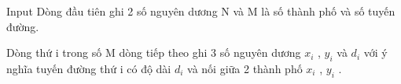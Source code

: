Input  
Dòng đầu tiên ghi 2 số nguyên dương N và M là số thành phố và số tuyến đường.  

   Dòng thứ i trong số M dòng tiếp theo ghi 3 số nguyên dương $x_{i}$   , $y_{i}$   và $d_{i}$   với ý nghĩa tuyến đường thứ i có độ dài $d_{i}$   và nối giữa 2 thành phố $x_{i}$   , $y_{i}$   .